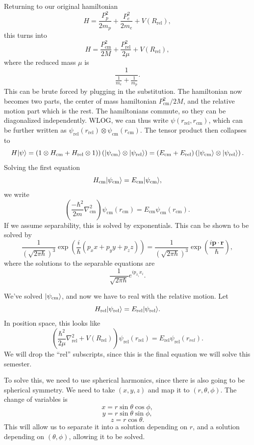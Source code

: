 Returning to our original hamiltonian
\[
	H=\frac{P^2_p}{2m_p} +\frac{P^2_e}{2m_e} +V\left( R_{\text{rel} }  \right) ,
\]
this turns into
\[
	H=\frac{P^2_{\text{cm} } }{2M} +\frac{P^2_{\text{rel} } }{2\mu } +V\left( R_{\text{rel} }  \right) ,
\]
where the reduced mass $\mu $ is
\[
	\frac{1}{\frac{1}{m_e} +\frac{1}{m_p} } 
.\]
This can be brute forced by plugging in the substitution. The hamiltonian now becomes two parts, the center of mass hamiltonian $P^2_{\text{cm} } /2M$, and the relative motion part which is the rest. The hamiltonians commute, so they can be diagonalized independently. WLOG, we can thus write $\psi (r_{\text{rel} } ,r_{\text{cm} } )$, which can be further written as $\psi_{\text{rel} } (r_{\text{rel} } )\otimes \psi _{\text{cm} } (r_{\text{cm} } )$. The tensor product then collapses to
\[
	H\lvert\psi \rangle =\left( 1\otimes H_{\text{cm} }+H_{\text{rel} } \otimes 1  \right) )\left( \lvert\psi_{\text{cm} }  \rangle\otimes \lvert\psi _{\text{rel} } \rangle  \right) =\left( E_{\text{cm} } +E_{\text{rel} }  \right) \left( \lvert\psi _{\text{cm} } \rangle \otimes \lvert\psi _{\text{rel} } \rangle  \right) 
.\]
Solving the first equation
\[
	H_{\text{cm} } \lvert\psi _{\text{cm} } \rangle =E_{\text{cm} } \lvert\psi _{\text{cm} } \rangle ,
\]
we write
\[
\left( \frac{-\hbar ^2}{2m} \nabla ^2_{\text{cm} }  \right) \psi_{\text{cm}} (r_{\text{cm} }  )=E_{\text{cm} } \psi _{\text{cm} } (r_{\text{cm} } )
.\]
If we assume separability, this is solved by exponentials. This can be shown to be solved by
\[
	\frac{1}{\left( \sqrt{2\pi \hbar }  \right) ^3} \exp \left( \frac{i}{\hbar } \left( p_xx+p_yy+p_zz \right)  \right) =\frac{1}{\left( \sqrt{2\pi \hbar }  \right) ^3} \exp\left( \frac{i \mathbf{p} \cdot \mathbf{r} }{\hbar } \right)
,\]
where the solutions to the separable equations are
\[
	\frac{1}{\sqrt{2\pi \hbar } } e^{ip_{x_i} x_i} 
.\]

We've solved $\lvert\psi_{\text{cm} } \rangle $, and now we have to real with the relative motion. Let
\[
	H_{\text{rel} } \lvert\psi _{\text{rel} } \rangle =E_{\text{rel} } \lvert\psi _{\text{rel} } \rangle 
.\]
In position space, this looks like
\[
	\left(\frac{\hbar ^2}{2\mu } \nabla_{\text{rel} }^2+V(R_{\text{rel}}) \right)\psi _{\text{rel} }(r_{\text{rel}} ) =E_{\text{rel} } \psi _{\text{rel} }(r_{rel} )
.\]
We will drop the ``rel'' subscripts, since this is the final equation we will solve this semester.

To solve this, we need to use spherical harmonics, since there is also going to be spherical symmetry. We need to take $(x,y,z)$ and map it to $(r,\theta ,\phi )$. The change of variables is
\[
	x=r \sin \theta \cos \phi ,
\]
\[
	y=r \sin \theta \sin \phi ,
\]
\[
	z=r \cos \theta 
.\]
This will allow us to separate it into a solution depending on $r$, and a solution depending on $(\theta ,\phi )$, allowing it to be solved.

